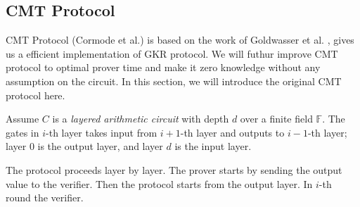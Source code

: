 
\subsection{CMT Protocol}
CMT Protocol (Cormode et al.)\cite{CMT} is based on the work of Goldwasser et al. \cite{GKR}, gives us a efficient implementation of GKR protocol. We will futhur improve CMT protocol to optimal prover time and make it zero knowledge without any assumption on the circuit. In this section, we will introduce the original CMT protocol here.

Assume $C$ is a \textit{layered arithmetic circuit} with depth $d$ over a finite field $\mathbb{F}$. The gates in $i$-th layer takes input from $i+1$-th layer and outputs to $i-1$-th layer; layer $0$ is the output layer, and layer $d$ is the input layer. 

The protocol proceeds layer by layer. The prover starts by sending the output value to the verifier. Then the protocol starts from the output layer. In $i$-th round the verifier.


